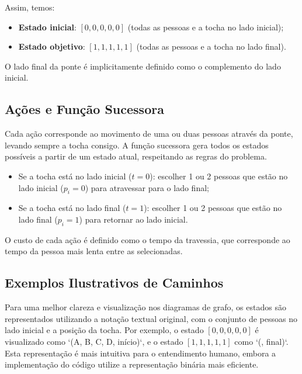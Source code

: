 \documentclass[12pt,a4paper]{article}
\begin{document}
Assim, temos:
\begin{itemize}
    \item \textbf{Estado inicial}: $[0, 0, 0, 0, 0]$ (todas as pessoas e a tocha no lado inicial);
    \item \textbf{Estado objetivo}: $[1, 1, 1, 1, 1]$ (todas as pessoas e a tocha no lado final).
\end{itemize}

O lado final da ponte é implicitamente definido como o complemento do lado inicial.

\subsection{Ações e Função Sucessora}
Cada ação corresponde ao movimento de uma ou duas pessoas através da ponte, levando sempre a tocha consigo. A função sucessora gera todos os estados possíveis a partir de um estado atual, respeitando as regras do problema.

\begin{itemize}
    \item Se a tocha está no lado inicial ($t = 0$): escolher 1 ou 2 pessoas que estão no lado inicial ($p_i = 0$) para atravessar para o lado final;
    \item Se a tocha está no lado final ($t = 1$): escolher 1 ou 2 pessoas que estão no lado final ($p_i = 1$) para retornar ao lado inicial.
\end{itemize}

O custo de cada ação é definido como o tempo da travessia, que corresponde ao tempo da pessoa mais lenta entre as selecionadas.



\subsection{Exemplos Ilustrativos de Caminhos}
Para uma melhor clareza e visualização nos diagramas de grafo, os estados são representados utilizando a notação textual original, com o conjunto de pessoas no lado inicial e a posição da tocha. Por exemplo, o estado $[0, 0, 0, 0, 0]$ é visualizado como `({A, B, C, D}, início)`, e o estado $[1, 1, 1, 1, 1]$ como `({}, final)`. Esta representação é mais intuitiva para o entendimento humano, embora a implementação do código utilize a representação binária mais eficiente.
\end{document}
